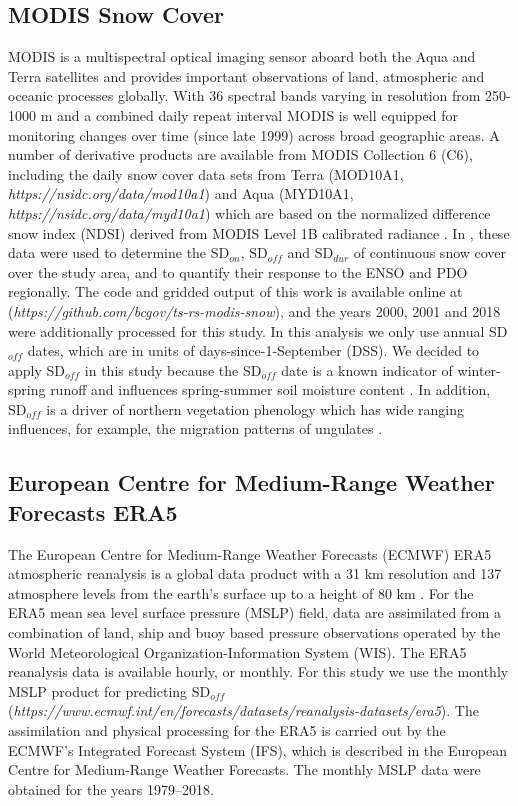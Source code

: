 \documentclass{tATO2e}
\newcommand{\sdoff}{SD$_{off}$}
\newcommand{\sdon}{SD$_{on}$}
\newcommand{\sddur}{SD$_{dur}$}
\begin{document}
\subsection{MODIS Snow Cover}
MODIS is a multispectral optical imaging sensor aboard both the Aqua and Terra satellites and provides important observations of land, atmospheric and oceanic processes globally. With 36 spectral bands varying in resolution from 250-1000 m and a combined daily repeat interval MODIS is well equipped for monitoring changes over time (since late 1999) across broad geographic areas. A number of derivative products are available from MODIS Collection 6 (C6), including the daily snow cover data sets from Terra (MOD10A1, \textit{https://nsidc.org/data/mod10a1}) and Aqua (MYD10A1, \textit{https://nsidc.org/data/myd10a1}) which are based on the normalized difference snow index (NDSI) derived from MODIS Level 1B calibrated radiance \citep{Riggs2016}. In \cite{Bevington2019}, these data were used to determine the \sdon{}, \sdoff{} and \sddur{} of continuous snow cover over the study area, and to quantify their response to the ENSO and PDO regionally. The code and gridded output of this work is available online at (\textit{https://github.com/bcgov/ts-rs-modis-snow}), and the years 2000, 2001 and 2018 were additionally processed for this study. In this analysis we only use annual \sdoff{} dates, which are in units of days-since-1-September (DSS). We decided to apply \sdoff{} in this study because the \sdoff{} date is a known indicator of winter-spring runoff and influences spring-summer soil moisture content \citep{Cohen1994}. In addition, \sdoff{} is a driver of northern vegetation phenology which has wide ranging influences, for example, the migration patterns of ungulates \citep{John2020}.

\subsection{European Centre for Medium-Range Weather Forecasts ERA5}
The European Centre for Medium-Range Weather Forecasts (ECMWF) ERA5 atmospheric reanalysis is a global data product with a 31 km resolution and 137 atmosphere levels from the earth's surface up to a height of 80 km \citep{ERA52019}. For the ERA5 mean sea level surface pressure (MSLP) field, data are assimilated from a combination of land, ship and buoy based pressure observations operated by the World Meteorological Organization-Information System (WIS). The ERA5 reanalysis data is available hourly, or monthly. For this study we use the monthly MSLP product for predicting \sdoff{} (\textit{https://www.ecmwf.int/en/forecasts/datasets/reanalysis-datasets/era5}). The assimilation and physical processing for the ERA5 is carried out by the ECMWF’s Integrated Forecast System (IFS), which is described in the European Centre for Medium-Range Weather Forecasts. The monthly MSLP data were obtained for the years 1979--2018.
\end{document}
